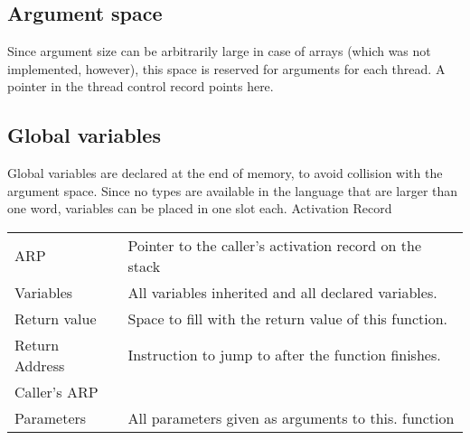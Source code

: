 \documentclass[10pt,a4paper]{report}
\begin{document}
\subsection{Argument space}
Since argument size can be arbitrarily large in case of arrays (which was not implemented, however), this space is reserved for arguments for each thread. A pointer in the thread control record points here.
       
\subsection{Global variables}
Global variables are declared at the end of memory, to avoid collision with the argument space. Since no types are available in the language that are larger than one word, variables can be placed in one slot each.
\label{fig:actrecord}
Activation Record
 
\begin{tabular}{| l || l |}
\hline
	ARP & Pointer to the caller's activation record on the stack\\
	Variables & All variables inherited and all declared variables.\\
	Return value & Space to fill with the return value of this function.\\
	Return Address & Instruction to jump to after the function finishes.\\
	Caller's ARP & \\
	Parameters & All parameters given as arguments to this. function\\
\hline
\end{tabular}
\end{document}
